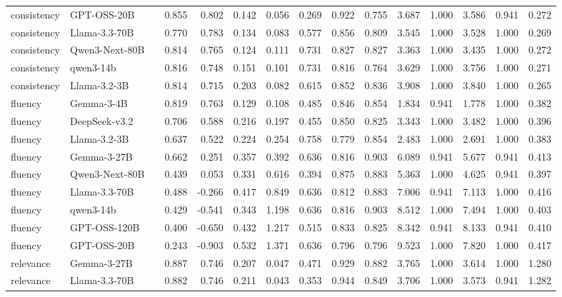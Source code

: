 \begin{table}[t]
{\begin{tabular}{llrrrrrrrrrrrrr}
consistency & GPT-OSS-20B &  & 0.855 & 0.802 & 0.142 & 0.056 & 0.269 & 0.922 & 0.755 & 3.687 & 1.000 & 3.586 & 0.941 & 0.272 \\
consistency & Llama-3.3-70B &  & 0.770 & 0.783 & 0.134 & 0.083 & 0.577 & 0.856 & 0.809 & 3.545 & 1.000 & 3.528 & 1.000 & 0.269 \\
consistency & Qwen3-Next-80B &  & 0.814 & 0.765 & 0.124 & 0.111 & 0.731 & 0.827 & 0.827 & 3.363 & 1.000 & 3.435 & 1.000 & 0.272 \\
consistency & qwen3-14b &  & 0.816 & 0.748 & 0.151 & 0.101 & 0.731 & 0.816 & 0.764 & 3.629 & 1.000 & 3.756 & 1.000 & 0.271 \\
consistency & Llama-3.2-3B &  & 0.814 & 0.715 & 0.203 & 0.082 & 0.615 & 0.852 & 0.836 & 3.908 & 1.000 & 3.840 & 1.000 & 0.265 \\
fluency & Gemma-3-4B &  & 0.819 & 0.763 & 0.129 & 0.108 & 0.485 & 0.846 & 0.854 & 1.834 & 0.941 & 1.778 & 1.000 & 0.382 \\
fluency & DeepSeek-v3.2 &  & 0.706 & 0.588 & 0.216 & 0.197 & 0.455 & 0.850 & 0.825 & 3.343 & 1.000 & 3.482 & 1.000 & 0.396 \\
fluency & Llama-3.2-3B &  & 0.637 & 0.522 & 0.224 & 0.254 & 0.758 & 0.779 & 0.854 & 2.483 & 1.000 & 2.691 & 1.000 & 0.383 \\
fluency & Gemma-3-27B &  & 0.662 & 0.251 & 0.357 & 0.392 & 0.636 & 0.816 & 0.903 & 6.089 & 0.941 & 5.677 & 0.941 & 0.413 \\
fluency & Qwen3-Next-80B &  & 0.439 & 0.053 & 0.331 & 0.616 & 0.394 & 0.875 & 0.883 & 5.363 & 1.000 & 4.625 & 0.941 & 0.397 \\
fluency & Llama-3.3-70B &  & 0.488 & -0.266 & 0.417 & 0.849 & 0.636 & 0.812 & 0.883 & 7.006 & 0.941 & 7.113 & 1.000 & 0.416 \\
fluency & qwen3-14b &  & 0.429 & -0.541 & 0.343 & 1.198 & 0.636 & 0.816 & 0.903 & 8.512 & 1.000 & 7.494 & 1.000 & 0.403 \\
fluency & GPT-OSS-120B &  & 0.400 & -0.650 & 0.432 & 1.217 & 0.515 & 0.833 & 0.825 & 8.342 & 0.941 & 8.133 & 0.941 & 0.410 \\
fluency & GPT-OSS-20B &  & 0.243 & -0.903 & 0.532 & 1.371 & 0.636 & 0.796 & 0.796 & 9.523 & 1.000 & 7.820 & 1.000 & 0.417 \\
relevance & Gemma-3-27B &  & 0.887 & 0.746 & 0.207 & 0.047 & 0.471 & 0.929 & 0.882 & 3.765 & 1.000 & 3.614 & 1.000 & 1.280 \\
relevance & Llama-3.3-70B &  & 0.882 & 0.746 & 0.211 & 0.043 & 0.353 & 0.944 & 0.849 & 3.706 & 1.000 & 3.573 & 0.941 & 1.282 \\

\end{tabular}}
\end{table}

